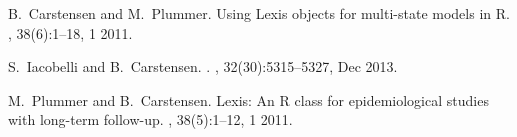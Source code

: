 \documentclass[a4paper,twoside,12pt]{report}
\begin{document}

  \begin{thebibliography}{1}

B.~Carstensen and M.~Plummer.
\newblock Using {L}exis objects for multi-state models in {R}.
, 38(6):1--18, 1 2011.

S.~Iacobelli and B.~Carstensen.
.
, 32(30):5315--5327, Dec 2013.

M.~Plummer and B.~Carstensen.
\newblock Lexis: An {R} class for epidemiological studies with long-term
  follow-up.
, 38(5):1--12, 1 2011.

\end{thebibliography}

\end{document}
